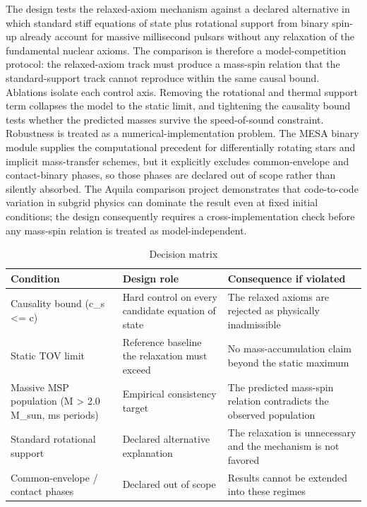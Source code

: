 \documentclass[conference]{IEEEtran}
\begin{document}
The design tests the relaxed-axiom mechanism against a declared alternative in which standard stiff equations of state plus rotational support from binary spin-up already account for massive millisecond pulsars without any relaxation of the fundamental nuclear axioms. The comparison is therefore a model-competition protocol: the relaxed-axiom track must produce a mass-spin relation that the standard-support track cannot reproduce within the same causal bound. Ablations isolate each control axis. Removing the rotational and thermal support term collapses the model to the static limit, and tightening the causality bound tests whether the predicted masses survive the speed-of-sound constraint. Robustness is treated as a numerical-implementation problem. The MESA binary module supplies the computational precedent for differentially rotating stars and implicit mass-transfer schemes, but it explicitly excludes common-envelope and contact-binary phases, so those phases are declared out of scope rather than silently absorbed. The Aquila comparison project demonstrates that code-to-code variation in subgrid physics can dominate the result even at fixed initial conditions; the design consequently requires a cross-implementation check before any mass-spin relation is treated as model-independent.~\cite{cite_58f0ac6612957738,cite_c369df652181e8f7}

\begin{table}[htbp]
\centering
\footnotesize
\setlength{\tabcolsep}{3pt}
\renewcommand{\arraystretch}{1.12}
\caption{Decision matrix}
\label{tab:study-design-and-methods-s3}
\begin{tabular}{|p{}|p{}|p{}|}
\hline
Condition & Design role & Consequence if violated \\\hline
Causality bound (c\_s <= c) & Hard control on every candidate equation of state & The relaxed axioms are rejected as physically inadmissible \\\hline
Static TOV limit & Reference baseline the relaxation must exceed & No mass-accumulation claim beyond the static maximum \\\hline
Massive MSP population (M > 2.0 M\_sun, ms periods) & Empirical consistency target & The predicted mass-spin relation contradicts the observed population \\\hline
Standard rotational support & Declared alternative explanation & The relaxation is unnecessary and the mechanism is not favored \\\hline
Common-envelope / contact phases & Declared out of scope & Results cannot be extended into these regimes \\\hline
\end{tabular}
\end{table}~\cite{cite_42e341ff6471ce89,cite_55957f4ce67bd972}
\end{document}
